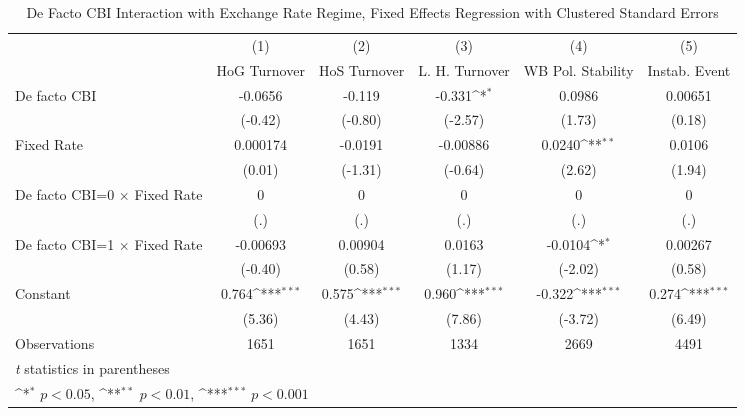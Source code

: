 \begin{table}[htbp]\centering
\def\sym#1{\ifmmode^{#1}\else\(^{#1}\)\fi}
\caption{De Facto CBI Interaction with Exchange Rate Regime, Fixed Effects Regression with Clustered Standard Errors \label{imultIndFEDF}}
\begin{tabular}{l*{5}{c}}
\toprule
                                        &\multicolumn{1}{c}{(1)}&\multicolumn{1}{c}{(2)}&\multicolumn{1}{c}{(3)}&\multicolumn{1}{c}{(4)}&\multicolumn{1}{c}{(5)}\\
                                        &\multicolumn{1}{c}{HoG Turnover}&\multicolumn{1}{c}{HoS Turnover}&\multicolumn{1}{c}{L. H. Turnover}&\multicolumn{1}{c}{WB Pol. Stability}&\multicolumn{1}{c}{Instab. Event}\\
\midrule
De facto CBI                            &  -0.0656         &   -0.119         &   -0.331\sym{*}  &   0.0986         &  0.00651         \\
                                        &  (-0.42)         &  (-0.80)         &  (-2.57)         &   (1.73)         &   (0.18)         \\
\addlinespace
Fixed Rate                              & 0.000174         &  -0.0191         & -0.00886         &   0.0240\sym{**} &   0.0106         \\
                                        &   (0.01)         &  (-1.31)         &  (-0.64)         &   (2.62)         &   (1.94)         \\
\addlinespace
De facto CBI=0 $\times$ Fixed Rate      &        0         &        0         &        0         &        0         &        0         \\
                                        &      (.)         &      (.)         &      (.)         &      (.)         &      (.)         \\
\addlinespace
De facto CBI=1 $\times$ Fixed Rate      & -0.00693         &  0.00904         &   0.0163         &  -0.0104\sym{*}  &  0.00267         \\
                                        &  (-0.40)         &   (0.58)         &   (1.17)         &  (-2.02)         &   (0.58)         \\
\addlinespace
Constant                                &    0.764\sym{***}&    0.575\sym{***}&    0.960\sym{***}&   -0.322\sym{***}&    0.274\sym{***}\\
                                        &   (5.36)         &   (4.43)         &   (7.86)         &  (-3.72)         &   (6.49)         \\
\midrule
Observations                            &     1651         &     1651         &     1334         &     2669         &     4491         \\
\bottomrule
\multicolumn{6}{l}{\footnotesize \textit{t} statistics in parentheses}\\
\multicolumn{6}{l}{\footnotesize \sym{*} \(p<0.05\), \sym{**} \(p<0.01\), \sym{***} \(p<0.001\)}\\
\end{tabular}
\end{table}
